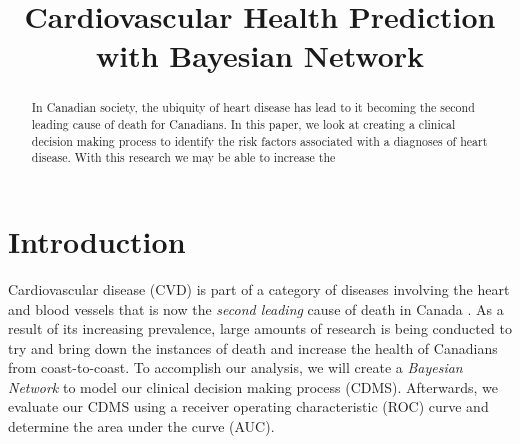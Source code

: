 \documentclass[conference]{IEEEtran}
\begin{document}
\title{Cardiovascular Health Prediction with Bayesian Network}


\author{
}

\maketitle

\begin{abstract}
In Canadian society, the ubiquity of heart disease has lead to it becoming the second leading cause of death for Canadians. In this paper, we look at creating a clinical decision making process to identify the risk factors associated with a diagnoses of heart disease. With this research we may be able to increase the
\end{abstract}

\IEEEpeerreviewmaketitle

\section{Introduction}
Cardiovascular disease (CVD) is part of a category of diseases involving the heart and blood vessels that is now the \textit{second leading} cause of death in Canada \cite{StatsCan}. As a result of its increasing prevalence, large amounts of research is being conducted to try and bring down the instances of death and increase the health of Canadians from coast-to-coast. To accomplish our analysis, we will create a \textit{Bayesian Network} to model our clinical decision making process (CDMS). Afterwards, we evaluate our CDMS using a receiver operating characteristic (ROC) curve and determine the area under the curve (AUC).  
\end{document}
